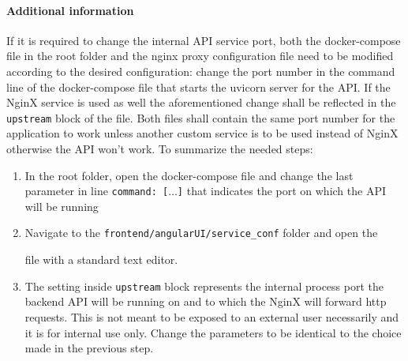 \documentclass{scrreprt}
\begin{document}
\paragraph{Additional information}
If it is required to change the internal API service port, both the docker-compose file in the root folder and the nginx proxy configuration file need to be modified according to the desired configuration: change the port number in the command line of the docker-compose file that starts the uvicorn server for the API. If the NginX service is used as well the aforementioned change shall be reflected in the \texttt{upstream} block of the \proxy \space file. Both files shall contain the same port number for the application to work unless another custom service is to be used instead of NginX otherwise the API won't work. To summarize the needed steps:
\begin{enumerate}
	\item In the root folder, open the docker-compose file and change the last parameter in line \texttt{command: [$\dots$]} that indicates the port on which the API will be running
	\item Navigate to the \texttt{frontend/angularUI/service\_conf} folder and open the 
	
	\proxy \space file with a standard text editor.
	\item The setting inside \texttt{upstream} block represents the internal process port the backend API will be running on and to which the NginX will forward http requests. This is not meant to be exposed to an external user necessarily and it is for internal use only. Change the parameters to be identical to the choice made in the previous step.
\end{enumerate}
\end{document}
